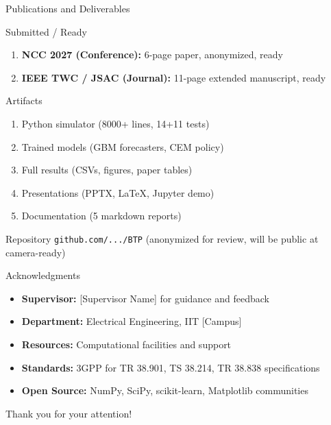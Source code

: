 \documentclass[aspectratio=169]{beamer}
\begin{document}
\begin{frame}{Publications and Deliverables}
\begin{block}{Submitted / Ready}
\begin{enumerate}
    \item \textbf{NCC 2027 (Conference):} 6-page paper, anonymized, ready
    \item \textbf{IEEE TWC / JSAC (Journal):} 11-page extended manuscript, ready
\end{enumerate}
\end{block}

\begin{block}{Artifacts}
\begin{enumerate}
    \item Python simulator (8000+ lines, 14+11 tests)
    \item Trained models (GBM forecasters, CEM policy)
    \item Full results (CSVs, figures, paper tables)
    \item Presentations (PPTX, LaTeX, Jupyter demo)
    \item Documentation (5 markdown reports)
\end{enumerate}
\end{block}

\begin{block}{Repository}
\texttt{github.com/.../BTP} (anonymized for review, will be public at camera-ready)
\end{block}
\end{frame}

\begin{frame}{Acknowledgments}
\begin{itemize}
    \item \textbf{Supervisor:} [Supervisor Name] for guidance and feedback
    \item \textbf{Department:} Electrical Engineering, IIT [Campus]
    \item \textbf{Resources:} Computational facilities and support
    \item \textbf{Standards:} 3GPP for TR 38.901, TS 38.214, TR 38.838 specifications
    \item \textbf{Open Source:} NumPy, SciPy, scikit-learn, Matplotlib communities
\end{itemize}

\vspace{1cm}
\begin{center}
\Large Thank you for your attention!
\end{center}
\end{frame}
\end{document}
